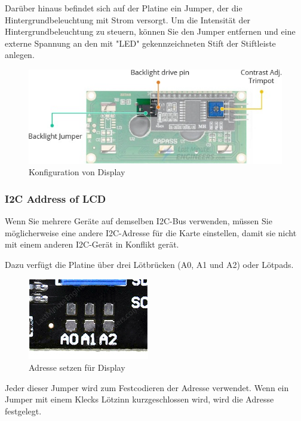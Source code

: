 \documentclass[conference]{IEEEtran}
\begin{document}
Darüber hinaus befindet sich auf der Platine ein Jumper, der die Hintergrundbeleuchtung mit Strom versorgt. Um die Intensität der Hintergrundbeleuchtung zu steuern, können Sie den Jumper entfernen und eine externe Spannung an den mit "LED" gekennzeichneten Stift der Stiftleiste anlegen.


\begin{figure}[h]
	\begin{center}
		\includegraphics[scale=0.35]{dspl2}
	\end{center}
	\caption{Konfiguration von Display}
\end{figure}

\subsubsection{I2C Address of LCD}
Wenn Sie mehrere Geräte auf demselben I2C-Bus verwenden, müssen Sie möglicherweise eine andere I2C-Adresse für die Karte einstellen, damit sie nicht mit einem anderen I2C-Gerät in Konflikt gerät.

Dazu verfügt die Platine über drei Lötbrücken (A0, A1 und A2) oder Lötpads.

\begin{figure}[h]
	\begin{center}
		\includegraphics[scale=0.45]{dspl3}
	\end{center}
	\caption{Adresse setzen für Display}
\end{figure}

Jeder dieser Jumper wird zum Festcodieren der Adresse verwendet. Wenn ein Jumper mit einem Klecks Lötzinn kurzgeschlossen wird, wird die Adresse festgelegt.
\end{document}
